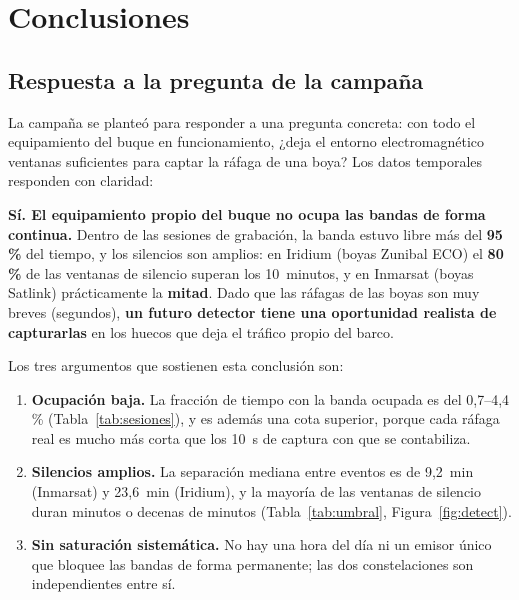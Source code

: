 \section{Conclusiones}
\label{sec:conclusiones}

\subsection{Respuesta a la pregunta de la campaña}

La campaña se planteó para responder a una pregunta concreta: con todo el equipamiento del buque en funcionamiento, ¿deja el entorno electromagnético ventanas suficientes para captar la ráfaga de una boya? Los datos temporales responden con claridad:

\begin{tcolorbox}[colback=deyposcolor!5, colframe=deyposcolor, title=Conclusión principal]
\textbf{Sí. El equipamiento propio del buque no ocupa las bandas de forma continua.} Dentro de las sesiones de grabación, la banda estuvo libre más del \textbf{95\,\%} del tiempo, y los silencios son amplios: en Iridium (boyas Zunibal ECO) el \textbf{80\,\%} de las ventanas de silencio superan los 10~minutos, y en Inmarsat (boyas Satlink) prácticamente la \textbf{mitad}. Dado que las ráfagas de las boyas son muy breves (segundos), \textbf{un futuro detector tiene una oportunidad realista de capturarlas} en los huecos que deja el tráfico propio del barco.
\end{tcolorbox}

Los tres argumentos que sostienen esta conclusión son:

\begin{enumerate}
    \item \textbf{Ocupación baja.} La fracción de tiempo con la banda ocupada es del 0,7--4,4\,\% (Tabla~\ref{tab:sesiones}), y es además una cota superior, porque cada ráfaga real es mucho más corta que los \SI{10}{\second} de captura con que se contabiliza.
    \item \textbf{Silencios amplios.} La separación mediana entre eventos es de 9,2~min (Inmarsat) y 23,6~min (Iridium), y la mayoría de las ventanas de silencio duran minutos o decenas de minutos (Tabla~\ref{tab:umbral}, Figura~\ref{fig:detect}).
    \item \textbf{Sin saturación sistemática.} No hay una hora del día ni un emisor único que bloquee las bandas de forma permanente; las dos constelaciones son independientes entre sí.
\end{enumerate}

